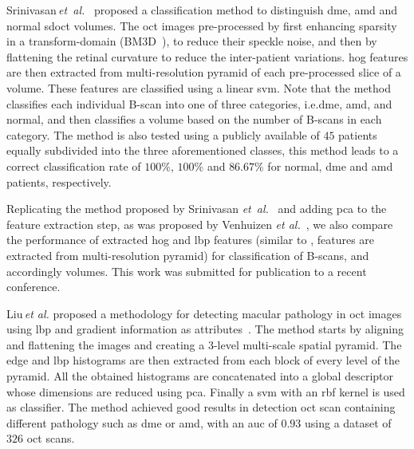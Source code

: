 %
Srinivasan\,\textit{et~al.}~\cite{Srinivasan2014} proposed a classification method to distinguish \gls{dme}, \gls{amd} and normal \gls{sdoct} volumes.
%
The \gls{oct} images pre-processed by first enhancing sparsity in a transform-domain (BM3D~\cite{dabov2007image}), to reduce their speckle noise, and then by flattening the retinal curvature to reduce the inter-patient variations.
\gls{hog} features are then extracted from multi-resolution pyramid of each pre-processed slice of a volume.
These features are classified using a linear \gls{svm}.
Note that the method classifies each individual B-scan into one of three categories, i.e.\gls{dme}, \gls{amd}, and normal, and then classifies a volume based on the number of B-scans in each category.
%
The method is also tested using a publicly available of $45$ patients equally subdivided into the three aforementioned classes, this method leads to a correct classification rate of $100 \%$, $100 \%$ and $86.67 \%$ for normal, \gls{dme} and \gls{amd} patients, respectively.

Replicating the method proposed by Srinivasan \textit{et~al.}~\cite{Srinivasan2014} and adding \gls{pca} to the feature extraction step, as was proposed by Venhuizen \textit{et al.}~\cite{Venhuizen2015}, we also compare the performance of extracted \gls{hog} and \gls{lbp} features (similar to \cite{Srinivasan2014}, features are extracted from multi-resolution pyramid) for classification of B-scans, and accordingly volumes.
{\color{red}This work was submitted for publication to a recent conference.}



Liu\,\textit{et al.} proposed a methodology for detecting macular pathology in \gls{oct} images using \gls{lbp} and gradient information as attributes~\cite{Liu2011}.
The method starts by aligning and flattening the images and creating a $3$-level multi-scale spatial pyramid.
The edge and \gls{lbp} histograms are then extracted from each block of every level of the pyramid.
All the obtained histograms are concatenated into a global descriptor whose dimensions are reduced using \gls{pca}.
Finally a \gls{svm} with an \gls{rbf} kernel is used as classifier.
The method achieved good results in detection \gls{oct} scan containing different pathology such as \gls{dme} or \gls{amd}, with an \gls{auc} of $0.93$ using a dataset of $326$ \gls{oct} scans.



